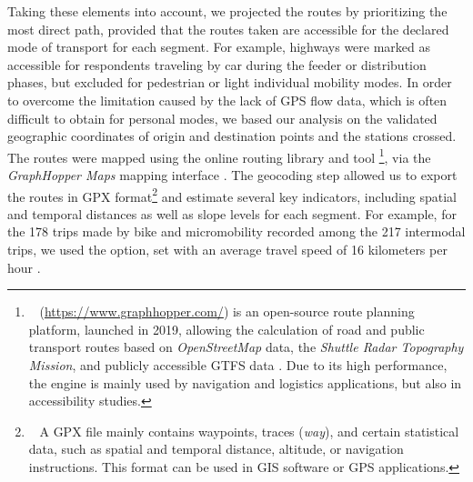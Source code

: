 \begin{refsegment}
Taking these elements into account, we projected the routes by prioritizing the most direct path, provided that the routes taken are accessible for the declared mode of transport for each segment. For example, highways were marked as accessible for respondents traveling by car during the feeder or distribution phases, but excluded for pedestrian or light individual mobility modes. In order to overcome the limitation caused by the lack of \acrshort{GPS} flow data, which is often difficult to obtain for personal modes, we based our analysis on the validated geographic coordinates of origin and destination points and the stations crossed. The routes were mapped using the online routing library and tool \footnote{~
     (\url{https://www.graphhopper.com/}) is an open-source route planning platform, launched in 2019, allowing the calculation of road and public transport routes based on \textsl{OpenStreetMap} data, the \textsl{Shuttle Radar Topography Mission}, and publicly accessible \acrshort{GTFS} data \textcolor{blue}{\autocite{graphhopper_graphhopper_2017}}. Due to its high performance, the engine is mainly used by navigation and logistics applications, but also in accessibility studies.
}, via the \textsl{GraphHopper Maps} mapping interface \textcolor{blue}{\autocite{graphhopper_graphhopper_2017}}. The geocoding step allowed us to export the routes in \acrfull{GPX} format\footnote{~
    A \acrfull{GPX} file mainly contains waypoints, traces (\textsl{way}), and certain statistical data, such as spatial and temporal distance, altitude, or navigation instructions. This format can be used in \acrshort{GIS} software or \acrshort{GPS} applications.
} and estimate several key indicators, including spatial and temporal distances as well as slope levels for each segment. For example, for the 178 trips made by bike and micromobility recorded among the 217 intermodal trips, we used the  option, set with an average travel speed of 16 kilometers per hour \textcolor{blue}{\autocite[18]{sebban_complementarite_2003}}.%


\end{refsegment}
